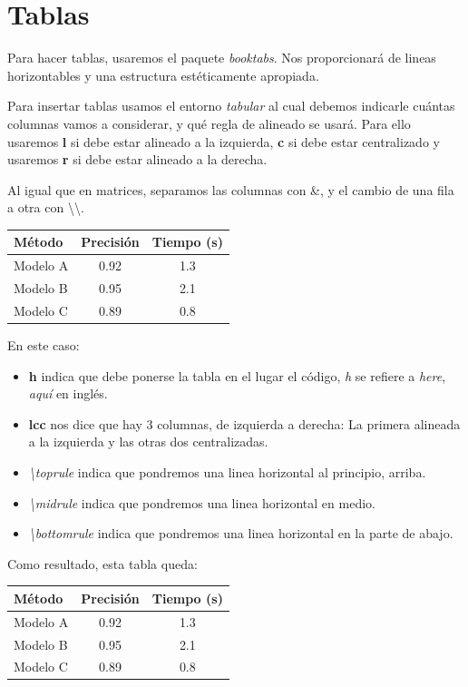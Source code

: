 \documentclass[graybox,envcountchap,sectrefs]{svmono}
\begin{document}
\section{Tablas}
%
Para hacer tablas, usaremos el paquete \emph{booktabs}.
Nos proporcionará de lineas horizontables y una estructura estéticamente apropiada.


Para insertar tablas usamos el entorno \emph{tabular}
al cual debemos indicarle cuántas columnas vamos a considerar, y qué regla de alineado se usará.
Para ello usaremos \textbf{l} si debe estar alineado a la izquierda, \textbf{c}
si debe estar centralizado y usaremos \textbf{r} si debe estar alineado a la derecha.


Al igual que en matrices, separamos las columnas con \&, y el cambio de una fila a otra
con \textbackslash\textbackslash.
\begin{code}
\begin{table}[h]
    \begin{tabular}{lcc}
        \toprule
        Método & Precisión & Tiempo (s) \\
        \midrule
        Modelo A & 0.92 & 1.3 \\
        Modelo B & 0.95 & 2.1 \\
        Modelo C & 0.89 & 0.8 \\
        \bottomrule
    \end{tabular}
\end{table}
\end{code}

En este caso:
    \begin{itemize}
        \item \textbf{h} indica que debe ponerse la tabla en el lugar el código,
            \emph{h} se refiere a \emph{here}, \emph{aquí} en inglés.
        \item \textbf{lcc} nos dice que hay 3 columnas, de izquierda a derecha: La primera alineada a la izquierda y las otras dos centralizadas.
        \item \emph{\textbackslash toprule} indica que pondremos una linea horizontal al principio, arriba.
        \item \emph{\textbackslash midrule} indica que pondremos una linea horizontal en medio.
        \item \emph{\textbackslash bottomrule} indica que pondremos una linea horizontal en la parte de abajo. 
    \end{itemize}
    Como resultado, esta tabla queda:
\begin{compiled}
    \begin{tabular}{lcc}
        \toprule
        Método & Precisión & Tiempo (s) \\
        \midrule
        Modelo A & 0.92 & 1.3 \\
        Modelo B & 0.95 & 2.1 \\
        Modelo C & 0.89 & 0.8 \\
        \bottomrule
    \end{tabular}
\end{compiled}
\end{document}
